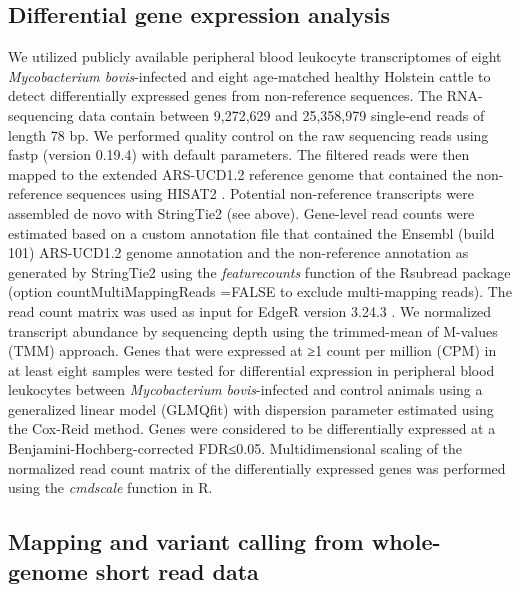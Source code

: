 \documentclass[../main.tex]{subfiles}
\begin{document}
\subsection*{Differential gene expression analysis}

We utilized publicly available peripheral blood leukocyte transcriptomes of eight \emph{Mycobacterium bovis}-infected and eight age-matched healthy Holstein cattle \citep{mcloughlin2014rna} to detect differentially expressed genes from non-reference sequences. The RNA-sequencing data contain between 9,272,629 and 25,358,979 single-end reads of length 78 bp. We performed quality control on the raw sequencing reads using fastp (version 0.19.4) \citep{chen2018fastp} with default parameters. The filtered reads were then mapped to the extended ARS-UCD1.2 reference genome that contained the non-reference sequences using HISAT2 \citep{kim2019graph}. Potential non-reference transcripts were assembled de novo with StringTie2 (see above). Gene-level read counts were estimated based on a custom annotation file that contained the Ensembl (build 101) ARS-UCD1.2 genome annotation and the non-reference annotation as generated by StringTie2 using the \emph{featurecounts} function of the Rsubread package (option countMultiMappingReads =FALSE to exclude multi-mapping reads). The read count matrix was used as input for EdgeR version 3.24.3 \citep{robinson2010edger}. We normalized transcript abundance by sequencing depth using the trimmed-mean of M-values (TMM) approach. Genes that were expressed at ≥1 count per million (CPM) in at least eight samples were tested for differential expression in peripheral blood leukocytes between \emph{Mycobacterium bovis}-infected and control animals using a generalized linear model (GLMQfit) with dispersion parameter estimated using the Cox-Reid method. Genes were considered to be differentially expressed at a Benjamini-Hochberg-corrected FDR≤0.05. Multidimensional scaling of the normalized read count matrix of the differentially expressed genes was performed using the \emph{cmdscale} function in R.

\subsection*{Mapping and variant calling from whole-genome short read data}
\end{document}

